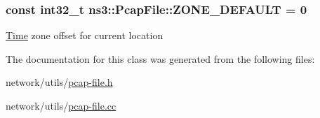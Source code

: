 \subsubsection[{\texorpdfstring{Z\+O\+N\+E\+\_\+\+D\+E\+F\+A\+U\+LT}{ZONE_DEFAULT}}]{\setlength{\rightskip}{0pt plus 5cm}const int32\+\_\+t ns3\+::\+Pcap\+File\+::\+Z\+O\+N\+E\+\_\+\+D\+E\+F\+A\+U\+LT = 0\hspace{0.3cm}{\ttfamily [static]}}\hypertarget{classns3_1_1PcapFile_abd695588f972dc80b0c928aeda466dc0}{}\label{classns3_1_1PcapFile_abd695588f972dc80b0c928aeda466dc0}
\hyperlink{classns3_1_1Time}{Time} zone offset for current location 

The documentation for this class was generated from the following files\+:\begin{DoxyCompactItemize}
\item 
network/utils/\hyperlink{pcap-file_8h}{pcap-\/file.\+h}\item 
network/utils/\hyperlink{pcap-file_8cc}{pcap-\/file.\+cc}\end{DoxyCompactItemize}
